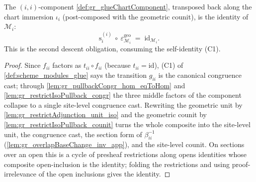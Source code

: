 \begin{lemma}
  \label{lem:gr_glueChartComponent_self_counit}
  The \((i,i)\)-component \cref{def:gr_glueChartComponent}, transposed back along the
  chart immersion \(\iota_i\) (post-composed with the geometric counit), is the
  identity of \(\mathcal{M}_i\):
  \[
    \mathrm{s}_i^{(i)}\ \circ\ \varepsilon^{\mathrm{geo}}_{\mathcal{M}_i}
      \;=\; \mathrm{id}_{\mathcal{M}_i}.
  \]
  This is the second descent obligation, consuming the self-identity (C1).
\end{lemma}
\begin{proof}
    \leanok
  Since \(f_{ii}\) factors as \(t_{ii}\circ f_{ii}\) (because \(t_{ii} = \mathrm{id}\)),
  (C1) of \cref{def:scheme_modules_glue} says the transition \(g_{ii}\) is the
  canonical congruence cast; through \cref{lem:gr_pullbackCongr_hom_eqToHom} and
  \cref{lem:gr_restrictIsoPullback_congr} the three middle factors of the component
  collapse to a single site-level congruence cast. Rewriting the geometric unit by
  \cref{lem:gr_restrictAdjunction_unit_iso} and the geometric counit by
  \cref{lem:gr_restrictIsoPullback_counit} turns the whole composite into the
  site-level unit, the congruence cast, the section form of \(\beta_{ii}^{-1}\)
  (\cref{lem:gr_overlapBaseChange_inv_app}), and the site-level counit. On sections
  over an open this is a cycle of presheaf restrictions along opens identities whose
  composite open-inclusion is the identity; folding the restrictions and using
  proof-irrelevance of the open inclusions gives the identity.
\end{proof}

